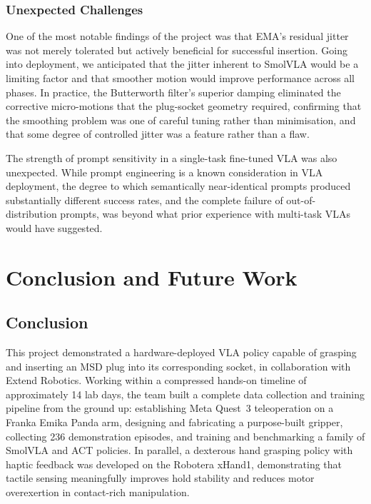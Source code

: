 \documentclass[conference]{IEEEtran}
\begin{document}
\subsubsection{Unexpected Challenges}

One of the most notable findings of the project was that EMA's residual jitter was not merely tolerated but actively beneficial for successful insertion. Going into deployment, we anticipated that the jitter inherent to SmolVLA would be a limiting factor and that smoother motion would improve performance across all phases. In practice, the Butterworth filter's superior damping eliminated the corrective micro-motions that the plug-socket geometry required, confirming that the smoothing problem was one of careful tuning rather than minimisation, and that some degree of controlled jitter was a feature rather than a flaw.

The strength of prompt sensitivity in a single-task fine-tuned VLA was also unexpected. While prompt engineering is a known consideration in VLA deployment, the degree to which semantically near-identical prompts produced substantially different success rates, and the complete failure of out-of-distribution prompts, was beyond what prior experience with multi-task VLAs would have suggested.

\section{Conclusion and Future Work}

\subsection{Conclusion}

This project demonstrated a hardware-deployed VLA policy capable of grasping and inserting an MSD plug into its corresponding socket, in collaboration with Extend Robotics. Working within a compressed hands-on timeline of approximately 14 lab days, the team built a complete data collection and training pipeline from the ground up: establishing Meta Quest~3 teleoperation on a Franka Emika Panda arm, designing and fabricating a purpose-built gripper, collecting 236 demonstration episodes, and training and benchmarking a family of SmolVLA and ACT policies. In parallel, a dexterous hand grasping policy with haptic feedback was developed on the Robotera xHand1, demonstrating that tactile sensing meaningfully improves hold stability and reduces motor overexertion in contact-rich manipulation.
\end{document}
